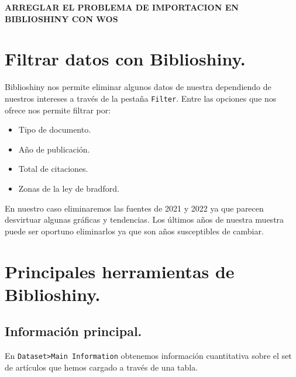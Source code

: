 \documentclass[
]{article}
\providecommand{\tightlist}{%
  \setlength{\itemsep}{0pt}\setlength{\parskip}{0pt}}
\begin{document}
\textbf{ARREGLAR EL PROBLEMA DE IMPORTACION EN BIBLIOSHINY CON WOS}

\hypertarget{filtrar-datos-con-biblioshiny.}{%
\section{Filtrar datos con
Biblioshiny.}\label{filtrar-datos-con-biblioshiny.}}

Biblioshiny nos permite eliminar algunos datos de nuestra dependiendo de
nuestros intereses a través de la pestaña \texttt{Filter}. Entre las
opciones que nos ofrece nos permite filtrar por:

\begin{itemize}
\tightlist
\item
  Tipo de documento.
\item
  Año de publicación.
\item
  Total de citaciones.
\item
  Zonas de la ley de bradford.
\end{itemize}

En nuestro caso eliminaremos las fuentes de 2021 y 2022 ya que parecen
desvirtuar algunas gráficas y tendencias. Los últimos años de nuestra
muestra puede ser oportuno eliminarlos ya que son años susceptibles de
cambiar.

\hypertarget{principales-herramientas-de-biblioshiny.}{%
\section{Principales herramientas de
Biblioshiny.}\label{principales-herramientas-de-biblioshiny.}}

\hypertarget{informaciuxf3n-principal.}{%
\subsection{Información principal.}\label{informaciuxf3n-principal.}}

En \texttt{Dataset\textgreater{}Main\ Information} obtenemos información
cuantitativa sobre el set de artículos que hemos cargado a través de una
tabla.
\end{document}
